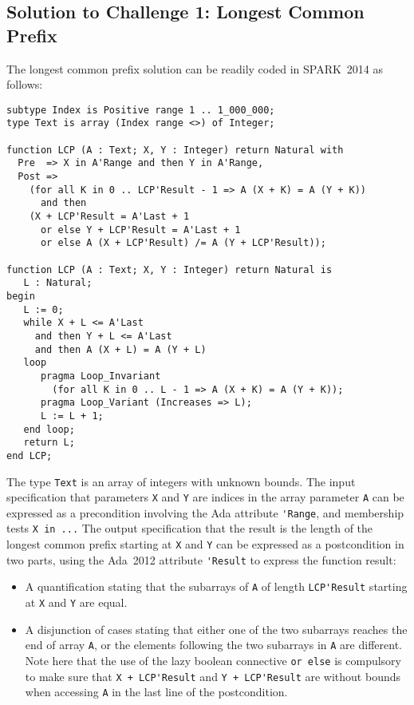 \documentclass[sttt,draft]{svjour}
\newcommand{\newspark}{SPARK~2014\xspace}
\newcommand{\adatwtw}{Ada~2012\xspace}
\begin{document}
\subsection{Solution to Challenge 1: Longest Common Prefix}

The longest common prefix solution can be readily coded in \newspark as follows:

\begin{footnotesize}
\begin{verbatim}
subtype Index is Positive range 1 .. 1_000_000;
type Text is array (Index range <>) of Integer;

function LCP (A : Text; X, Y : Integer) return Natural with
  Pre  => X in A'Range and then Y in A'Range,
  Post =>
    (for all K in 0 .. LCP'Result - 1 => A (X + K) = A (Y + K))
      and then
    (X + LCP'Result = A'Last + 1
      or else Y + LCP'Result = A'Last + 1
      or else A (X + LCP'Result) /= A (Y + LCP'Result));

function LCP (A : Text; X, Y : Integer) return Natural is
   L : Natural;
begin
   L := 0;
   while X + L <= A'Last
     and then Y + L <= A'Last
     and then A (X + L) = A (Y + L)
   loop
      pragma Loop_Invariant
        (for all K in 0 .. L - 1 => A (X + K) = A (Y + K));
      pragma Loop_Variant (Increases => L);
      L := L + 1;
   end loop;
   return L;
end LCP;
\end{verbatim}
\end{footnotesize}

The type \verb|Text| is an array of integers with unknown bounds. The input
specification that parameters \verb|X| and \verb|Y| are indices in the array
parameter \verb|A| can be expressed as a precondition involving the Ada
attribute \verb|'Range|, and membership tests \verb|X in ...| The output
specification that the result is the length of the longest common prefix
starting at \verb|X| and \verb|Y| can be expressed as a postcondition in two
parts, using the \adatwtw attribute \verb|'Result| to express the function
result:
\begin{itemize}
\item A quantification stating that the subarrays of \verb|A| of length
  \verb|LCP'Result| starting at \verb|X| and \verb|Y| are equal.
\item A disjunction of cases stating that either one of the two subarrays
  reaches the end of array \verb|A|, or the elements following the two
  subarrays in \verb|A| are different. Note here that the use of the lazy
  boolean connective \verb|or else| is compulsory to make sure that
  \verb|X + LCP'Result| and \verb|Y + LCP'Result| are without bounds when
  accessing \verb|A| in the last line of the postcondition.
\end{itemize}
\end{document}
